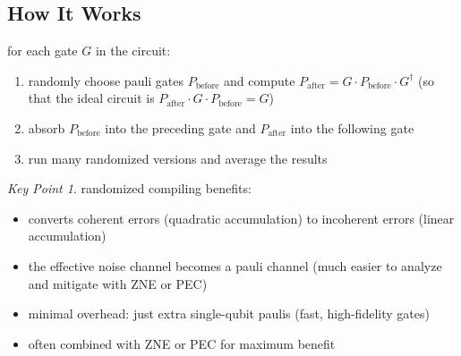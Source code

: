\documentclass[11pt,a4paper]{article}
\theoremstyle{definition}
\theoremstyle{remark}
\newtheorem*{keypoint}{Key Point}
\begin{document}
\subsection{How It Works}

for each gate $G$ in the circuit:
\begin{enumerate}
    \item randomly choose pauli gates $P_{\text{before}}$ and compute $P_{\text{after}} = G \cdot P_{\text{before}} \cdot G^\dagger$ (so that the ideal circuit is $P_{\text{after}} \cdot G \cdot P_{\text{before}} = G$)
    \item absorb $P_{\text{before}}$ into the preceding gate and $P_{\text{after}}$ into the following gate
    \item run many randomized versions and average the results
\end{enumerate}

\begin{center}
\end{center}

\begin{keypoint}
randomized compiling benefits:
\begin{itemize}
    \item converts coherent errors (quadratic accumulation) to incoherent errors (linear accumulation)
    \item the effective noise channel becomes a pauli channel (much easier to analyze and mitigate with ZNE or PEC)
    \item minimal overhead: just extra single-qubit paulis (fast, high-fidelity gates)
    \item often combined with ZNE or PEC for maximum benefit
\end{itemize}
\end{keypoint}
\end{document}
